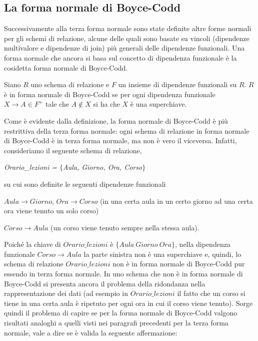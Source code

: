 \subsection{La forma normale di Boyce-Codd}
Successivamente alla terza forma normale sono state definite altre forme normali per gli schemi di relazione, alcune delle 
quali sono basate su vincoli (dipendenze multivalore e dipendenze di join) più generali delle dipendenze funzionali. Una 
forma normale che ancora si basa sul concetto di dipendenza funzionale è la cosidetta forma normale di Boyce-Codd.
\begin{defn}
Siano $R$ uno schema di relazione e $F$ un insieme di dipendenze funzionali su $R$. $R$ è in forma normale di Boyce-Codd 
se per ogni dipendenza funzionale $X \rightarrow A \in F^+$ tale che $A \not\in X$ si ha che $X$ è una superchiave.
\end{defn}
Come è evidente dalla definizione, la forma normale di Boyce-Codd è più restrittiva della terza forma normale: ogni schema 
di relazione in forma normale di Boyce-Codd è in terza forma normale, ma non è vero il viceversa. Infatti, consideriamo 
il seguente schema di relazione, 
\begin{center}
\emph{Orario\_lezioni = $\{$Aula, Giorno, Ora, Corso$\}$}                      
\end{center}
su cui sono definite le seguenti dipendenze funzionali 
\begin{center}
$Aula \rightarrow Giorno$, $Ora \rightarrow Corso$ (in una certa aula in un certo giorno ad una certa
ora viene tenuto un solo corso)  
\end{center}
\begin{center}
$Corso \rightarrow Aula$ (un corso viene tenuto sempre nella stessa aula).
\end{center}
Poiché la chiave di $Orario\_lezioni$ è $\{Aula\ Giorno\ Ora\}$, nella dipendenza funzionale $Corso \rightarrow Aula$ la
parte sinistra non è una superchiave e, quindi, lo schema di relazione $Orario\_lezioni$ non è in forma normale di 
Boyce-Codd pur essendo in terza forma normale. In uno schema che non è in forma normale di Boyce-Codd si presenta ancora 
il problema della ridondanza nella rappresentazione dei dati (ad esempio in $Orario\_lezioni$ il fatto che un corso si 
tiene in una certa aula è ripetuto per ogni ora in cui il corso viene tenuto). Sorge quindi il problema di capire se per
la forma normale di Boyce-Codd valgono risultati analoghi a quelli visti nei paragrafi precedenti per la terza forma
normale, vale a dire se è valida la seguente affermazione:\\

